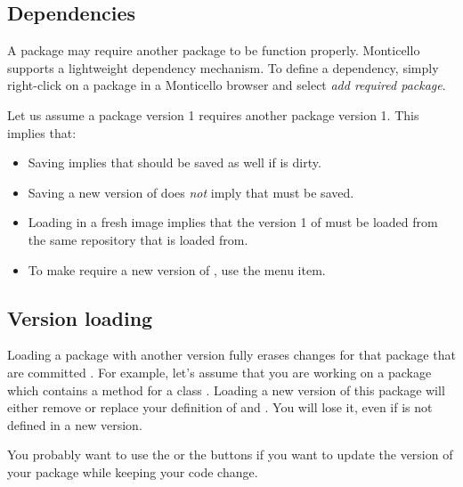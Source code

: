 \documentclass[a4paper,10pt,twoside]{book}
\begin{document}
\subsection{Dependencies}

A package may require another package to be function properly. Monticello supports a lightweight dependency mechanism. To define a dependency, simply right-click on a package in a Monticello browser and select \emph{add required package}.

Let us assume a package  version 1 requires another package  version 1. This implies that:

\begin{itemize}
\item Saving  implies that  should be saved as well if  is dirty.
\item Saving a new version of  does \emph{not} imply that  must be saved.
\item Loading  in a fresh image implies that the version 1 of  must be loaded from the same repository that  is loaded from.
\item To make  require a new version of , use the  menu item.
\end{itemize}

\subsection{Version loading}

Loading a package with another version fully erases changes for that package that are committed . For example, let's assume that you are working on a package which contains a method  for a class . Loading a new version of this package will either remove or replace your definition of  and . You will lose it, even if  is not defined in a new version.

You probably want to use the  or the  buttons if you want to update the version of your package while keeping your code change.
\end{document}
